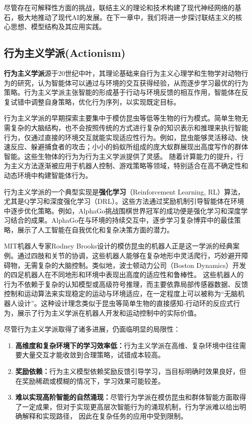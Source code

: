 尽管存在可解释性方面的挑战，联结主义的理论和技术构建了现代神经网络的基石，极大地推动了现代AI的发展。在下一章中，我们将进一步探讨联结主义的核心思想、模型结构及其应用实践。

\subsection{行为主义学派(Actionism)}

{\bf 行为主义学派}源于20世纪中叶，其理论基础来自行为主义心理学和生物学对动物行为的研究，认为智能体可以通过与环境的交互获得经验，从而逐步学习最优的行为策略。行为主义学派主张智能的形成基于行动与环境反馈的相互作用，智能体在反复试错中调整自身策略，优化行为序列，以实现既定目标。

行为主义学派的早期探索主要集中于模仿昆虫等低等生物的行为模式。简单生物无需复杂的大脑结构，也不会按照传统的方式进行复杂的知识表示和推理来执行智能行为，仅通过直接的环境交互就能实现适应性行为。例如，昆虫能够灵活移动、快速反应、躲避捕食者的攻击；小小的蚂蚁所组成的庞大蚁群展现出高度写作的群体智能。这些生物体的行为为行为主义学派提供了灵感。 随着计算能力的提升，行为主义方法逐渐被应用于机器人控制、游戏策略等领域，特别适合在高不确定性和动态环境中构建智能体行为。

行为主义学派的一个典型实现是{\bf 强化学习}（Reinforcement Learning, RL）算法，尤其是Q学习和深度强化学习（DRL）。这些方法通过奖励机制引导智能体在环境中逐步优化策略。例如，AlphaGo挑战围棋世界冠军的成功便是强化学习和深度学习结合的成果。AlphaGo在与环境的持续交互中，逐步学习复杂博弈中的最佳策略，展示了人工智能在自我优化和复杂决策方面的潜力。

MIT机器人专家Rodney Brooks设计的模仿昆虫的机器人正是这一学派的经典案例。通过四肢和关节的协调，这些机器人能够在复杂地形中灵活爬行，巧妙避开障碍物，无需复杂的大脑控制。类似地，波士顿动力公司（Boston Dynamics）开发的四足机器人在不同地形和环境中表现出高度的适应性和鲁棒性。
这些机器人的行为不依赖于复杂的认知模型或高级符号推理，而主要依靠局部传感器数据、反馈控制和运动算法来实现稳定的运动与环境适应，在一定程度上可以被称为“无脑机器人设计”。这种设计理念类似于昆虫等简单生物的直接感知-行动环的反应式行为，展示了行为主义学派在机器人开发和运动控制中的实际价值。

尽管行为主义学派取得了诸多进展，仍面临明显的局限性：

\begin{enumerate}
\item {\bf 高维度和复杂环境下的学习效率低：}行为主义学派在高维、复杂环境中往往需要大量交互才能收敛到合理策略，试错成本较高。
\item {\bf 奖励依赖：}行为主义模型依赖奖励反馈引导学习，当目标明确时效果良好，但在奖励稀疏或模糊的情况下，学习效果可能较差。
\item {\bf 难以实现高阶智能的自然涌现：}尽管行为学派在模仿昆虫和群体智能方面取得了一定成果，但对于实现更高层次智能行为的涌现机制，行为学派难以给出明确解释和实现路径，%
因此在复杂任务的应用中受到限制。
\end{enumerate}

